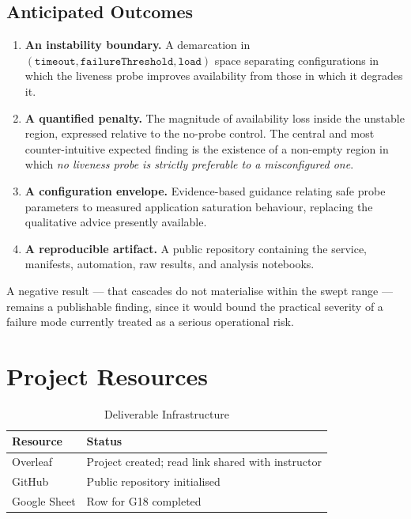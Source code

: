 \documentclass[conference]{IEEEtran}
\begin{document}
\subsection{Anticipated Outcomes}

\begin{enumerate}
\item \textbf{An instability boundary.} A demarcation in
$(\texttt{timeout}, \texttt{failureThreshold}, \texttt{load})$ space
separating configurations in which the liveness probe improves
availability from those in which it degrades it.

\item \textbf{A quantified penalty.} The magnitude of availability
loss inside the unstable region, expressed relative to the no-probe
control. The central and most counter-intuitive expected finding is
the existence of a non-empty region in which \emph{no liveness probe
is strictly preferable to a misconfigured one}.

\item \textbf{A configuration envelope.} Evidence-based guidance
relating safe probe parameters to measured application saturation
behaviour, replacing the qualitative advice presently available.

\item \textbf{A reproducible artifact.} A public repository
containing the service, manifests, automation, raw results, and
analysis notebooks.
\end{enumerate}

A negative result --- that cascades do not materialise within the
swept range --- remains a publishable finding, since it would bound
the practical severity of a failure mode currently treated as a
serious operational risk.

\section{Project Resources}

\begin{table}[h]
\centering
\caption{Deliverable Infrastructure}
\label{tab:resources}
\footnotesize
\begin{tabular}{@{}p{}p{}@{}}
\toprule
\textbf{Resource} & \textbf{Status} \\
\midrule
Overleaf & Project created; read link shared with instructor \\
GitHub & Public repository initialised \\
Google Sheet & Row for G18 completed \\
\bottomrule
\end{tabular}
\end{table}



\end{document}
